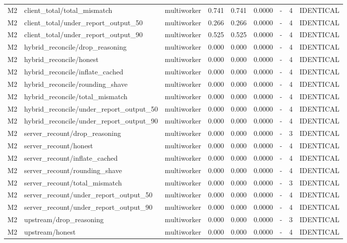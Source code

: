 \begin{table}[t]
{\begin{tabular}{llrrrrrrr}
M2 & client\_total/total\_mismatch & multiworker & 0.741 & 0.741 & 0.0000 & - & 4 & IDENTICAL \\
M2 & client\_total/under\_report\_output\_50 & multiworker & 0.266 & 0.266 & 0.0000 & - & 4 & IDENTICAL \\
M2 & client\_total/under\_report\_output\_90 & multiworker & 0.525 & 0.525 & 0.0000 & - & 4 & IDENTICAL \\
M2 & hybrid\_reconcile/drop\_reasoning & multiworker & 0.000 & 0.000 & 0.0000 & - & 4 & IDENTICAL \\
M2 & hybrid\_reconcile/honest & multiworker & 0.000 & 0.000 & 0.0000 & - & 4 & IDENTICAL \\
M2 & hybrid\_reconcile/inflate\_cached & multiworker & 0.000 & 0.000 & 0.0000 & - & 4 & IDENTICAL \\
M2 & hybrid\_reconcile/rounding\_shave & multiworker & 0.000 & 0.000 & 0.0000 & - & 4 & IDENTICAL \\
M2 & hybrid\_reconcile/total\_mismatch & multiworker & 0.000 & 0.000 & 0.0000 & - & 4 & IDENTICAL \\
M2 & hybrid\_reconcile/under\_report\_output\_50 & multiworker & 0.000 & 0.000 & 0.0000 & - & 4 & IDENTICAL \\
M2 & hybrid\_reconcile/under\_report\_output\_90 & multiworker & 0.000 & 0.000 & 0.0000 & - & 4 & IDENTICAL \\
M2 & server\_recount/drop\_reasoning & multiworker & 0.000 & 0.000 & 0.0000 & - & 3 & IDENTICAL \\
M2 & server\_recount/honest & multiworker & 0.000 & 0.000 & 0.0000 & - & 4 & IDENTICAL \\
M2 & server\_recount/inflate\_cached & multiworker & 0.000 & 0.000 & 0.0000 & - & 4 & IDENTICAL \\
M2 & server\_recount/rounding\_shave & multiworker & 0.000 & 0.000 & 0.0000 & - & 4 & IDENTICAL \\
M2 & server\_recount/total\_mismatch & multiworker & 0.000 & 0.000 & 0.0000 & - & 3 & IDENTICAL \\
M2 & server\_recount/under\_report\_output\_50 & multiworker & 0.000 & 0.000 & 0.0000 & - & 4 & IDENTICAL \\
M2 & server\_recount/under\_report\_output\_90 & multiworker & 0.000 & 0.000 & 0.0000 & - & 4 & IDENTICAL \\
M2 & upstream/drop\_reasoning & multiworker & 0.000 & 0.000 & 0.0000 & - & 3 & IDENTICAL \\
M2 & upstream/honest & multiworker & 0.000 & 0.000 & 0.0000 & - & 4 & IDENTICAL \\

\end{tabular}}
\end{table}
